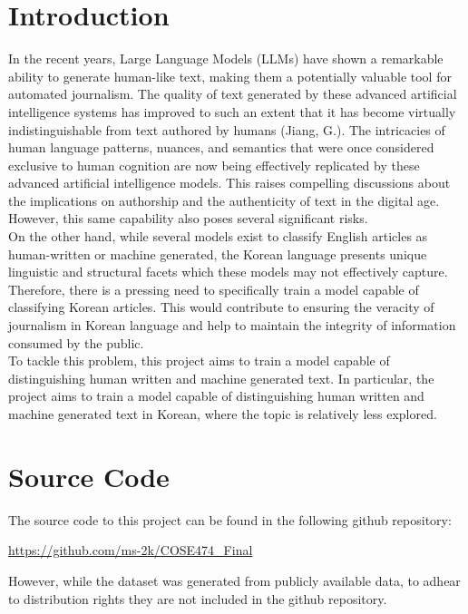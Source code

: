 \documentclass{article}
\begin{document}
\section{Introduction}
\quad In the recent years, Large Language Models (LLMs) have shown a remarkable ability to generate human-like text, making them a potentially valuable tool for automated journalism.
The quality of text generated by these advanced artificial intelligence systems has improved to such an extent that it has become virtually indistinguishable from text authored by humans (Jiang, G.).
The intricacies of human language patterns, nuances, and semantics that were once considered exclusive to human cognition are now being effectively replicated by these advanced artificial intelligence models.
This raises compelling discussions about the implications on authorship and the authenticity of text in the digital age.
However, this same capability also poses several significant risks. \\
\null\quad On the other hand, while several models exist to classify English articles as human-written or machine generated,
the Korean language presents unique linguistic and structural facets which these models may not effectively capture.
Therefore, there is a pressing need to specifically train a model capable of classifying Korean articles.
This would contribute to ensuring the veracity of journalism in Korean language and help to maintain the integrity of information consumed by the public. \\
\null\quad To tackle this problem, this project aims to train a model capable of distinguishing human written and machine generated text.
In particular, the project aims to train a model capable of distinguishing human written and machine generated text in Korean, where the topic is relatively less explored. \\

\section{Source Code}
\null\quad The source code to this project can be found in the following github repository:
\begin{center} \url{https://github.com/ms-2k/COSE474_Final} \end{center}
\null\quad However, while the dataset was generated from publicly available data, to adhear to distribution rights they are not included in the github repository.
\end{document}
